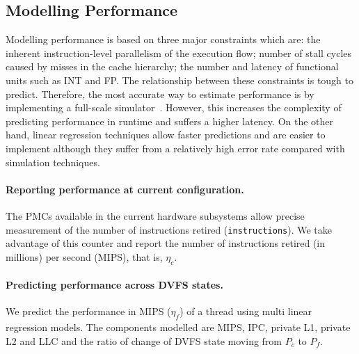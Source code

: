 
\subsection{Modelling Performance}
\label{subsec: model performance}

Modelling performance is based on three major constraints which are: {\small
{}} the inherent instruction-level parallelism of the execution flow;
{\small {}} number of stall cycles caused by misses in the cache hierarchy;
{\small {}} the number and latency of functional units such as INT and FP.
The relationship between these constraints is tough to predict.  Therefore, the
most accurate way to estimate performance is by implementing a full-scale
simulator~\citep{6114398,Miftakhutdinov:2012:PPI:2457472.2457493}. However, this increases
the complexity of predicting performance in runtime and suffers a higher latency. On the
other hand, linear regression techniques allow faster predictions and are easier to
implement although they suffer from a relatively high error rate compared with simulation
techniques.%

\paragraph{Reporting performance at current configuration.} The PMCs available in the
current hardware subsystems allow precise measurement of the number of instructions
retired (\texttt{instructions}). We take advantage of this counter and report the number
of instructions retired (in millions) per second (MIPS), that is, $\eta_\mathit{c}$. 



\paragraph{Predicting performance across DVFS states.} We predict the performance in MIPS
($\eta_\mathit{f}$) of a thread using multi linear regression models. The components
modelled are MIPS, IPC, private L1, private L2 and LLC and
the ratio of change of DVFS state moving from $P_\mathit{c}$ to $P_\mathit{f}$.

